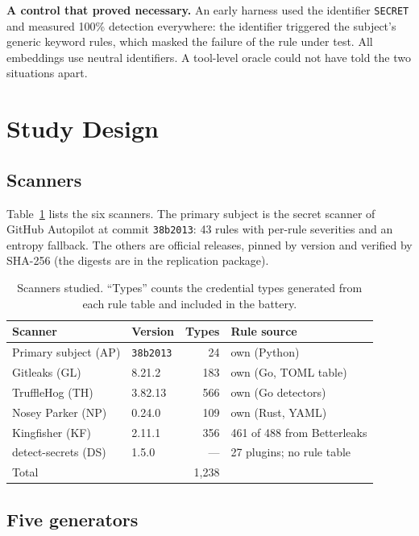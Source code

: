 \documentclass[10pt,journal,compsoc]{IEEEtran}
\begin{document}
\textbf{A control that proved necessary.} An early harness used the identifier \texttt{SECRET} and measured 100\% detection everywhere: the identifier triggered the subject's generic keyword rules, which masked the failure of the rule under test. All embeddings use neutral identifiers. A tool-level oracle could not have told the two situations apart.

\section{Study Design}
\label{sec:design}

\subsection{Scanners}
\label{sec:subjects}

Table~\ref{tab:tools} lists the six scanners. The primary subject is the secret scanner of GitHub Autopilot at commit \texttt{38b2013}: 43 rules with per-rule severities and an entropy fallback. The others are official releases, pinned by version and verified by SHA-256 (the digests are in the replication package).

\begin{table}[t]
\centering
\caption{Scanners studied. ``Types'' counts the credential types generated from each rule table and included in the battery.}
\label{tab:tools}
\footnotesize
\setlength{\tabcolsep}{3pt}
\begin{tabular}{@{}llrl@{}}
\toprule
Scanner & Version & Types & Rule source \\
\midrule
Primary subject (AP) & \texttt{38b2013} & 24 & own (Python) \\
Gitleaks (GL) & 8.21.2 & 183 & own (Go, TOML table) \\
TruffleHog (TH) & 3.82.13 & 566 & own (Go detectors) \\
Nosey Parker (NP) & 0.24.0 & 109 & own (Rust, YAML) \\
Kingfisher (KF) & 2.11.1 & 356 & 461 of 488 from Betterleaks \\
detect-secrets (DS) & 1.5.0 & --- & 27 plugins; no rule table \\
\midrule
Total & & 1{,}238 & \\
\bottomrule
\end{tabular}
\end{table}

\subsection{Five generators}
\label{sec:generators}
\end{document}
